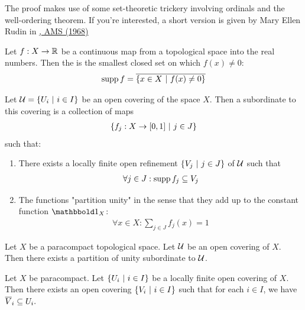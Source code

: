 \begin{proofsketch}
	The proof makes use of some set-theoretic trickery involving ordinals and the well-ordering theorem. If you're interested, a short version is given by Mary Ellen Rudin in \hyperlink{https://www.ams.org/journals/proc/1969-020-02/S0002-9939-1969-0236876-3/S0002-9939-1969-0236876-3.pdf}{, AMS (1968)}
\end{proofsketch}
\begin{importantdefinition}{}{}
	Let $f : X \to \mathbb{R}$ be a continuous map from a topological space into the real numbers. Then the  is the smallest closed set on which $f(x) \neq 0$:
	\begin{align*}
		\operatorname{supp} f = \overline{{\qty{x \in X ~\middle|~f(x) \neq 0}}}
	\end{align*}
\end{importantdefinition}
\begin{definition}
	Let $\mathcal{U} = \qty{U_i ~\middle|~i \in I}$ be an open covering of the space $X$. Then a  subordinate to this covering is a collection of maps
	\begin{align*}
		\qty{f_j : X \to [0,1] ~\middle|~j \in J}
	\end{align*}
	such that:
	\begin{enumerate}
		\item There exists a locally finite open refinement $\qty{V_j ~\middle|~j \in J}$ of $\mathcal{U}$ such that
		\begin{align*}
			\forall j \in J : \operatorname{supp} f_j \subseteq V_j
		\end{align*}
		\item The functions "partition unity" in the sense that they add up to the constant function $\boldone_X$:
		\begin{align*}
			\forall x \in X : \sum_{j \in J} f_j(x) = 1
		\end{align*}
	\end{enumerate}
\end{definition} 
\begin{theorem}
	Let $X$ be a paracompact topological space. Let $\mathcal{U}$ be an open covering of $X$. Then there exists a partition of unity subordinate to $\mathcal{U}$.
\end{theorem}
\begin{corollary}
	Let $X$ be paracompact. Let $\qty{U_i ~\middle|~i \in I}$ be a locally finite open covering of $X$. Then there exists an open covering $\qty{V_i ~\middle|~i \in I}$ such that for each $i \in I$, we have $\overline{{V}}_i \subseteq U_i.$
\end{corollary}
